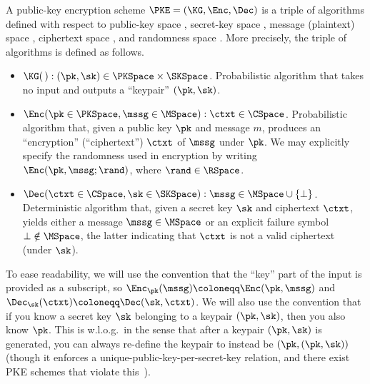 	    \begin{definition}\label{def:PKE}
	    	A public-key encryption scheme $\PKE = (\KG, \Enc, \Dec)$ is a triple of algorithms
	    	defined with respect to public-key space \PKSpace, secret-key space \SKSpace,
	    	message (plaintext) space \MSpace, ciphertext space \CSpace, and randomness space \RSpace.
	    	More precisely, the triple of algorithms is defined as follows.
	    	\begin{itemize}
	    		\item
            $\KG(\, ) : (\pk, \sk) \in \PKSpace \times \SKSpace$.
	    			Probabilistic algorithm that takes no input and outputs a ``keypair'' $(\pk, \sk)$.
	    		\item
	    			$\Enc(\pk \in \PKSpace, \mssg \in \MSpace) : \ctxt \in \CSpace$.
	    			Probabilistic algorithm that, given a public key $\pk$ and message $m$,
	    			produces an ``encryption'' (``ciphertext'') $\ctxt$ of $\mssg$ under $\pk$.
	    			We may explicitly specify the randomness used in encryption by
            writing $\Enc(\pk, \mssg; \rand)$, where $\rand \in \RSpace$.
	    		\item
	    			$\Dec(\ctxt \in \CSpace, \sk \in \SKSpace) : \mssg \in \MSpace \cup \{\bot\}$.
	    			Deterministic algorithm that, given a secret key $\sk$ and ciphertext $\ctxt$,
	    			yields either a message $\mssg \in \MSpace$ or an explicit failure symbol $\bot \notin \MSpace$,
	    			the latter indicating that $\ctxt$ is not a valid ciphertext (under $\sk$).
	    	\end{itemize}
	    \end{definition}
	    
      \noindent
      To ease readability, we will use the convention that the ``key'' part
        of the input is provided as a subscript, so $\Enc_\pk(\mssg) \coloneqq
        \Enc(\pk,\mssg)$ and $\Dec_\sk(\ctxt) \coloneqq \Dec(\sk, \ctxt)$.
      We will also use the convention that if you know a secret key $\sk$ belonging to a
        keypair $(\pk, \sk)$, then you also know $\pk$. This is w.l.o.g.\ in the sense
        that after a keypair $(\pk,\sk)$ is generated, you can always re-define the
        keypair to instead be $(\pk, (\pk, \sk))$ (though it enforces
        a unique-public-key-per-secret-key relation,
        and there exist PKE schemes that violate this~\cite{EC:BelHofYil09}).

